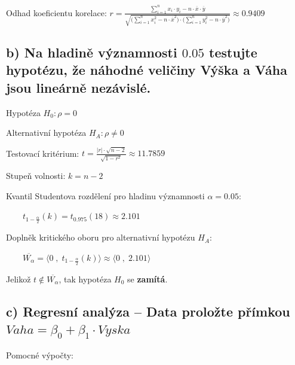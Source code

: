 \documentclass[11pt, a4paper, titlepage]{article}
\begin{document}
Odhad koeficientu korelace: ${\displaystyle r = \frac{\sum\limits_{i=1}^n x_i \cdot y_i - n \cdot \overline{x} \cdot \overline{y}} {\sqrt{ \bigg( \sum\limits_{i=1}^n x_i^2 - n \cdot \overline{x}^2\bigg) \cdot \bigg( \sum\limits_{i=1}^n y_i^2 - n \cdot \overline{y}^2 \bigg)}} \approx 0.9409}$

\newpage


\subsection*{b) Na hladině významnosti $0.05$ testujte hypotézu, že náhodné veličiny Výška a Váha jsou lineárně nezávislé.}
\medskip

Hypotéza ${\displaystyle H_0 : \rho = 0}$
\medskip

Alternativní hypotéza ${\displaystyle H_A : \rho \neq 0}$
\medskip

Testovací kritérium: ${\displaystyle t = \frac{|r| \cdot \sqrt{n - 2}}{\sqrt{1 - r^2}} \approx 11.7859}$
\medskip

Stupeň volnosti: ${\displaystyle k = n - 2}$
\medskip

Kvantil Studentova rozdělení pro hladinu významnosti ${\displaystyle \alpha = 0.05}$:
\medskip

${\displaystyle \qquad t_{1 - \frac{\alpha}{2}}(k) = t_{0.975}(18) \approx 2.101}$
\medskip

Doplněk kritického oboru pro alternativní hypotézu ${\displaystyle H_{A}}$:
\medskip

${\displaystyle \qquad \overline{W_\alpha} = \big\langle 0 \;,\; t_{1 - \frac{\alpha}{2}}(k) \big\rangle \approx \big\langle 0 \;,\; 2.101 \big\rangle}$
\medskip

Jelikož ${\displaystyle t \notin \overline{W_\alpha}}$, tak hypotéza ${\displaystyle H_0}$  se \textbf{zamítá}.
\bigskip

\noindent\makebox[\linewidth]{\rule{\paperwidth}{0.3pt}}


\subsection*{c) Regresní analýza -- Data proložte přímkou ${\displaystyle Vaha = \beta_0 + \beta_1 \cdot Vyska}$}
\medskip

Pomocné výpočty:
\end{document}
